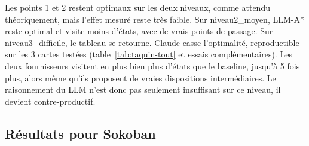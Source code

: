 \documentclass[11pt,a4paper]{article}
\begin{document}
Les points 1 et 2 restent optimaux sur les deux niveaux, comme attendu
théoriquement, mais l'effet mesuré reste très faible. Sur
niveau2\_moyen, LLM-A* reste optimal et visite moins d'états, avec de
vrais points de passage. Sur niveau3\_difficile, le tableau se
retourne. Claude casse l'optimalité, reproductible sur les 3 cartes
testées (table~\ref{tab:taquin-tout} et essais complémentaires). Les
deux fournisseurs visitent en plus bien plus d'états que le baseline,
jusqu'à 5 fois plus, alors même qu'ils proposent de vraies dispositions
intermédiaires. Le raisonnement du LLM n'est donc pas seulement
insuffisant sur ce niveau, il devient contre-productif.

\subsection{Résultats pour Sokoban}
\label{sec:claude-vs-deepseek}
\end{document}

